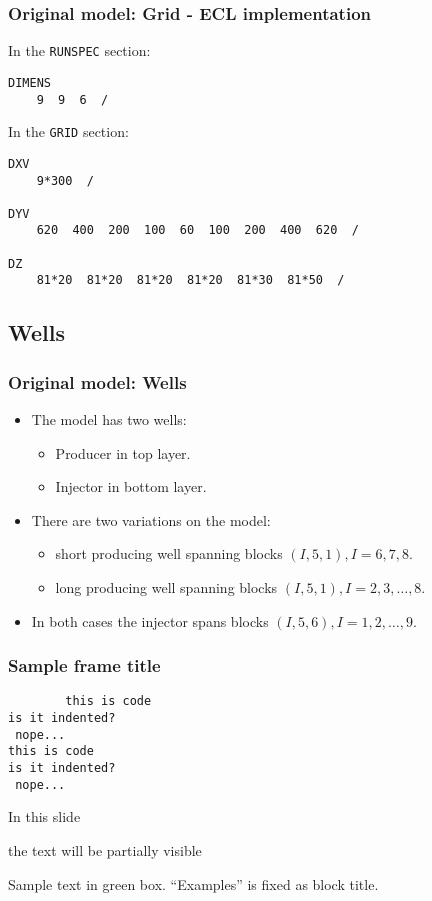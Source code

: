 \documentclass{beamer}
\begin{document}
\begin{frame}[fragile]
    \frametitle{Original model: Grid - ECL implementation}
        In the \texttt{RUNSPEC} section:
        \begin{code}
            \begin{verbatim}
DIMENS
    9  9  6  /
            \end{verbatim}
        \end{code}
        
        In the \texttt{GRID} section:
        \begin{code}
            \begin{verbatim}
DXV
    9*300  /

DYV
    620  400  200  100  60  100  200  400  620  /

DZ
    81*20  81*20  81*20  81*20  81*30  81*50  /
            \end{verbatim}
        \end{code}
\end{frame}

\subsection{Wells}
\begin{frame}
    \frametitle{Original model: Wells}
    \begin{itemize}
        \item The model has two wells:
            \begin{itemize}
                \item Producer in top layer.
                \item Injector in bottom layer.
            \end{itemize}
        \item There are two variations on the model:
        \begin{itemize}
             \item short producing well spanning blocks $(I,5,1), I=6,7,8$.
             \item long producing well spanning blocks $(I,5,1), I=2,3,\dots,8$.
        \end{itemize}
        \item In both cases the injector spans blocks $(I,5,6),I=1,2,\dots,9$.
    \end{itemize}
\end{frame}

\begin{frame}[fragile]
	\frametitle{Sample frame title}
	\begin{code}
        \begin{verbatim}
        this is code
is it indented?
 nope...
this is code
is it indented?
 nope...
        \end{verbatim}
    \end{code}
\end{frame}

\begin{frame}
 In this slide \pause
 
 the text will be partially visible
\end{frame}


\begin{frame}
	\begin{remark}
		Sample text in green box. ``Examples'' is fixed as block title.
	\end{remark}
\end{frame}
 
\end{document}
